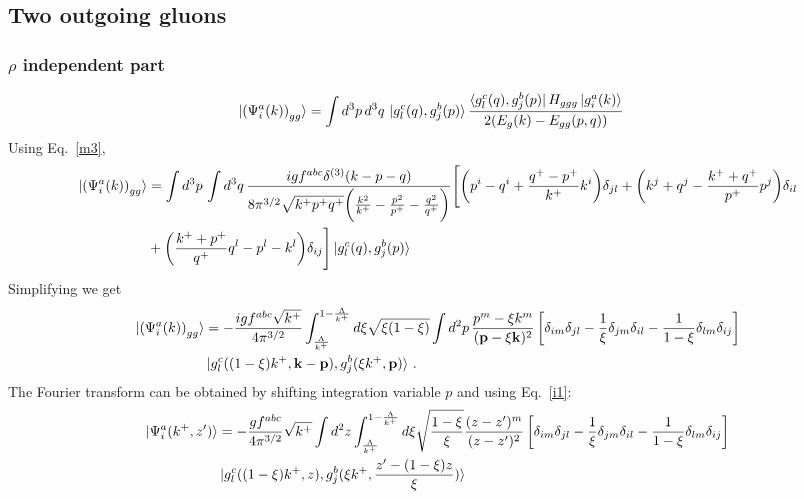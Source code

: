 \documentclass[aps,prd,amsmath,amssymb,nofootinbib]{revtex4-2}
\def\v#1{\mathbf{#1}}
\numberwithin{equation}{section}
\begin{document}
\subsection{Two outgoing gluons}   
\subsubsection{$\rho$ independent part}
\begin{figure}[h]
\end{figure}
\begin{align}\label{rhoindep}
  \ket{ \left(\Psi^{a}_{i}(k) \right)_{gg} } & =
   \int d^{3}p\, d^{3}q \, 
   \ket{g^{c}_{l}(q),g^{b}_{j}(p)}
   \frac{\bra{g^{c}_{l}(q),g^{b}_{j}(p)} H_{ggg} \ket{g^{a}_{i}(k)}}{2(E_g(k)-E_{gg}(p,q))}
\end{align}
Using Eq.~\eqref{m3}, 
\begin{align}
 \ket{ \left(\Psi^{a}_{i}(k) \right)_{gg} } & = \int d^{3}p\,\int d^{3}q\,\frac{igf^{abc}\delta^{(3)}(k-p-q)}{8\pi^{3/2}\sqrt{k^{+}p^{+}q^{+}}\bigg(\frac{k^{2}}{k^{+}}-\frac{p^{2}}{p^{+}}-\frac{q^{2}}{q^{+}}\bigg)}\Bigg[\bigg(p^{i}-q^{i}+\frac{q^{+}-p^{+}}{k^{+}}k^{i}\bigg)\delta_{jl}+\bigg(k^{j}+q^{j}-\frac{k^{+}+q^{+}}{p^{+}}p^{j}\bigg)\delta_{il}\notag \\ & +\bigg(\frac{k^{+}+p^{+}}{q^{+}}q^{l}-p^{l}-k^{l}\bigg)\delta_{ij}\Bigg]  \ket{g^{c}_{l}(q),g^{b}_{j}(p)}
 \end{align}
 Simplifying we get 
 \begin{align}
\ket{ \left(\Psi^{a}_{i}(k) \right)_{gg} } &  = -\frac{ i g f^{abc}\sqrt{k^+}} {4\pi^{3/2}} 
  \int_{ \frac{\Lambda}{k^+} }^{1 -  \frac{\Lambda}{k^+} } d\xi  \sqrt{\xi (1-\xi)} 
   \int d^{2}p\,  
   \frac{p^m - \xi k^m  }{( \v{p}- \xi \v{k} )^2 } \left[ \delta_{im} \delta_{jl}
     - \frac{1}{\xi}\delta_{jm} \delta_{il}
   - \frac{1}{1-\xi} \delta_{lm}\delta_{ij}
 \right]\notag \\ & 
 \ket{g^{c}_{l}((1-\xi)k^+,\v{k}-\v{p}),g^{b}_{j}(\xi k^+,\v{p})} 
 \,.
\end{align}
The Fourier transform can be obtained by shifting integration variable $p$ and using Eq.~\eqref{i1}: 
\begin{align}\label{gindeppos}
    \ket{\Psi^{a}_{i}(k^{+},z^{\prime})} & =  - \frac{g f^{abc}}{4\pi^{3/2}}\sqrt{k^+} \int d^2 z \int_{ \frac{\Lambda}{k^+} }^{1 -  \frac{\Lambda}{k^+} }  d\xi \sqrt{\frac{1-\xi} {\xi} }  \frac{(z-z^{\prime})^{m}}{(z-z^{\prime})^{2}}  \left[ \delta_{im} \delta_{jl}
     -\frac{1}{\xi}\delta_{jm} \delta_{il}
   -\frac{1}{1-\xi} \delta_{lm} \delta_{ij}
 \right] \notag \\ & \ket{g^{c}_{l}((1-\xi)k^{+},z),g^{b}_{j}(\xi k^{+},\frac{z^{\prime}-(1-\xi)z}{\xi})}
\end{align}
\end{document}
